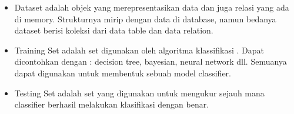 \begin{enumerate}
\begin{itemize}
\item Dataset adalah objek yang merepresentasikan data dan juga relasi yang ada di memory. Strukturnya mirip dengan data di database, namun bedanya dataset berisi koleksi dari data table dan data relation. 
\par
\item Training Set adalah set digunakan oleh algoritma klassifikasi . Dapat dicontohkan dengan :  decision tree, bayesian, neural network dll. Semuanya dapat digunakan untuk membentuk sebuah model classifier. 
\par
\item Testing Set adalah set yang digunakan untuk mengukur sejauh mana classifier berhasil melakukan klasifikasi dengan benar. 
\par
\end{itemize}
\end{enumerate} 


